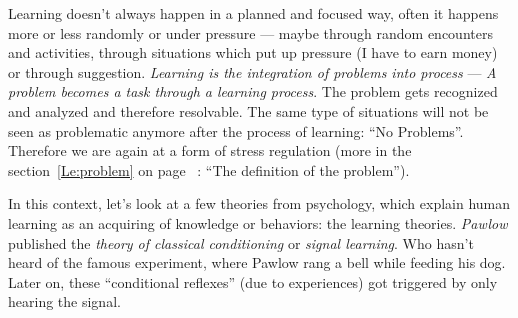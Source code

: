 \documentclass[../main.tex]{subfiles}
\begin{document}
Learning doesn't always happen in a planned and focused way, often it happens more or less {randomly or under pressure} --- maybe through random encounters and activities, through situations which put up pressure (I have to earn money) or through suggestion.
\emph{Learning is the integration of problems into process} ---  \emph{A problem becomes a task through a learning process}. The problem gets recognized and analyzed and therefore resolvable. The same type of situations will not be seen as problematic anymore after the process of learning: ``No Problems''. Therefore we are again at a form of stress regulation (more in the section~\ref{Le:problem} on page ~\pageref{Le:problem}: ``The definition of the problem'').


In this context, let's look at a few theories from psychology, which explain human learning as an acquiring of knowledge or behaviors: the learning theories.
\emph{Pawlow} published the \emph{theory of classical conditioning} or \emph{signal learning}.
Who hasn't heard of the famous experiment, where Pawlow rang a bell while feeding his dog. Later on, these ``conditional reflexes'' (due to experiences) got triggered by only hearing the signal.
\end{document}
